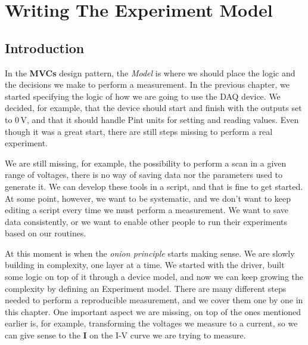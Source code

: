 \chapter{Writing The Experiment Model}\label{chapter:experiment-model}

\section{Introduction}
In the \textbf{MVCs} design pattern, the \emph{Model} is where we should place the logic and the decisions we make to perform a measurement. In the previous chapter, we started specifying the logic of how we are going to use the DAQ device. We decided, for example, that the device should start and finish with the outputs set to $0\,\textrm{V}$, and that it should handle Pint units for setting and reading values. Even though it was a great start, there are still steps missing to perform a real experiment.

We are still missing, for example, the possibility to perform a scan in a given range of voltages, there is no way of saving data nor the parameters used to generate it. We can develop these tools in a script, and that is fine to get started. At some point, however, we want to be systematic, and we don't want to keep editing a script every time we must perform a measurement. We want to save data consistently, or we want to enable other people to run their experiments based on our routines.

At this moment is when the \emph{onion principle} starts making sense. We are slowly building in complexity, one layer at a time. We started with the driver, built some logic on top of it through a device model, and now we can keep growing the complexity by defining an Experiment model. There are many different steps needed to perform a reproducible measurement, and we cover them one by one in this chapter. One important aspect we are missing, on top of the ones mentioned earlier is, for example, transforming the voltages we measure to a current, so we can give sense to the \textbf{I} on the I-V curve we are trying to measure.


